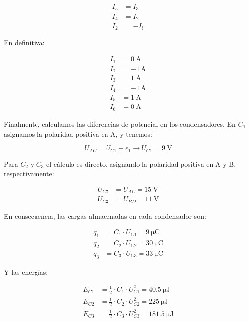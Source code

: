 \documentclass[10pt]{article}
\begin{document}
\begin{align*}
  I_5 &= I_3\\
  I_4 &= I_2\\
  I_2 &= -I_3
\end{align*}

En definitiva:

\begin{align*}
  I_1 &= \SI{0}{\ampere}\\
  I_2 &= \SI{-1}{\ampere}\\
  I_3 &= \SI{1}{\ampere}\\
  I_4 &= \SI{-1}{\ampere}\\
  I_5 &= \SI{1}{\ampere}\\
  I_6 &= \SI{0}{\ampere}
\end{align*}

Finalmente, calculamos las diferencias de potencial en los
condensadores. En $C_1$ asignamos la polaridad positiva en A, y
tenemos:

\begin{equation*}
  U_{AC} = U_{C1} + \epsilon_1 \rightarrow U_{C1} = \SI{9}{\volt}
\end{equation*}

Para $C_2$ y $C_3$ el cálculo es directo, asignando la polaridad positiva en A y B, respectivamente:

\begin{align*}
  U_{C2} &=  U_{AC} = \SI{15}{\volt}\\
  U_{C3} &=  U_{BD} = \SI{11}{\volt}
\end{align*}

En consecuencia, las cargas almacenadas en cada condensador son:

\begin{align*}
  q_1 &= C_1 \cdot U_{C1} = \SI{9}{\micro\coulomb}\\
  q_2 &= C_2 \cdot U_{C2} = \SI{30}{\micro\coulomb}\\
  q_3 &= C_3 \cdot U_{C3} = \SI{33}{\micro\coulomb}
\end{align*}

Y las energías:

\begin{align*}
  E_{C1} &= \frac{1}{2} \cdot C_1 \cdot U^2_{C1} = \SI{40.5}{\micro\joule}\\
  E_{C2} &= \frac{1}{2} \cdot C_2 \cdot U^2_{C2} = \SI{225}{\micro\joule}\\
  E_{C3} &= \frac{1}{2} \cdot C_3 \cdot U^2_{C3} = \SI{181.5}{\micro\joule}
\end{align*}
\end{document}
